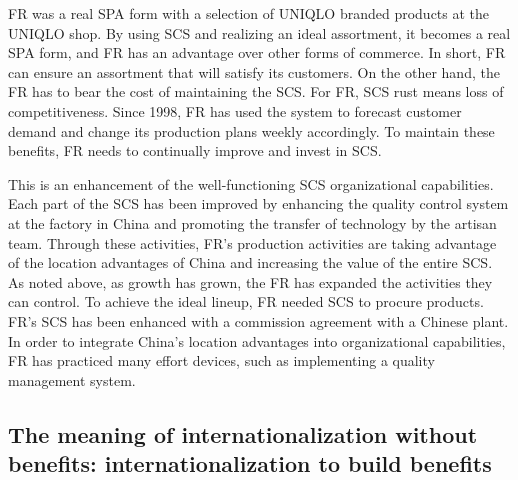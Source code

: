\documentclass[12pt,a4paper]{article}
\begin{document}
FR was a real SPA form with a selection of UNIQLO branded products at
the UNIQLO shop. By using SCS and realizing an ideal assortment, it
becomes a real SPA form, and FR has an advantage over other forms of
commerce. In short, FR can ensure an assortment that will satisfy its
customers. On the other hand, the FR has to bear the cost of maintaining
the SCS. For FR, SCS rust means loss of competitiveness. Since 1998, FR
has used the system to forecast customer demand and change its
production plans weekly accordingly. To maintain these benefits, FR
needs to continually improve and invest in SCS.

This is an enhancement of the well-functioning SCS organizational
capabilities. Each part of the SCS has been improved by enhancing the
quality control system at the factory in China and promoting the
transfer of technology by the artisan team. Through these activities,
FR's production activities are taking advantage of the location
advantages of China and increasing the value of the entire SCS. As noted
above, as growth has grown, the FR has expanded the activities they can
control. To achieve the ideal lineup, FR needed SCS to procure products.
FR's SCS has been enhanced with a commission agreement with a Chinese
plant. In order to integrate China's location advantages into
organizational capabilities, FR has practiced many effort devices, such
as implementing a quality management system.

\hypertarget{the-meaning-of-internationalization-without-benefits-internationalization-to-build-benefits}{%
\subsection{The meaning of internationalization without benefits:
internationalization to build
benefits}\label{the-meaning-of-internationalization-without-benefits-internationalization-to-build-benefits}}
\end{document}
